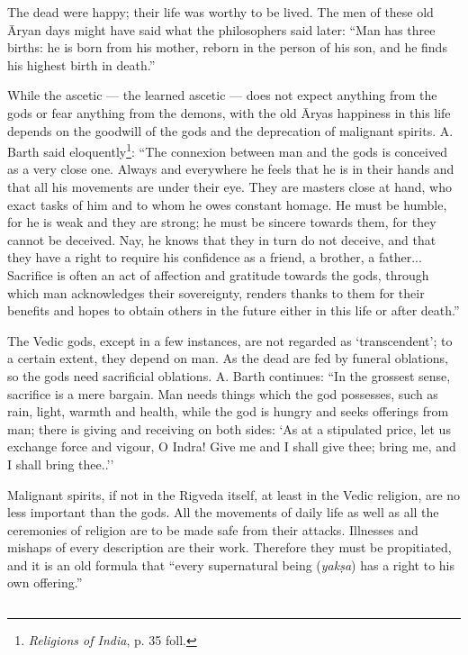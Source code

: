 \documentclass[a4paper, 11pt, oneside, english, landscape]{article}
\begin{document}
The dead were happy; their life was worthy to be lived. The men of these old Āryan days might have said what the philosophers said later: ``Man has three births: he is born from his mother, reborn in the person of his son, and he finds his highest birth in death.''

While the ascetic --- the learned ascetic --- does not expect anything from the gods or fear anything from the demons, with the old Āryas happiness in this life depends on the goodwill of the gods and the deprecation of malignant spirits. A. Barth said eloquently\footnote{\emph{Religions of India}, p. 35 foll.}: ``The connexion between man and the gods is conceived as a very close one. Always and everywhere he feels that he is in their hands and that all his movements are under their eye. They are masters close at hand, who exact tasks of him and to whom he owes constant homage. He must be humble, for he is weak and they are strong; he must be sincere towards them, for they cannot be deceived. Nay, he knows that they in turn do not deceive, and that they have a right to require his confidence as a friend, a brother, a father... Sacrifice is often an act of affection and gratitude towards the gods, through which man acknowledges their sovereignty, renders thanks to them for their benefits and hopes to obtain others in the future either in this life or after death.''

The Vedic gods, except in a few instances, are not regarded as `transcendent'; to a certain extent, they depend on man. As the dead are fed by funeral oblations, so the gods need sacrificial oblations. A. Barth continues: ``In the grossest sense, sacrifice is a mere bargain. Man needs things which the god possesses, such as rain, light, warmth and health, while the god is hungry and seeks offerings from man; there is giving and receiving on both sides: `As at a stipulated price, let us exchange force and vigour, O Indra! Give me and I shall give thee; bring me, and I shall bring thee..''

Malignant spirits, if not in the Rigveda itself, at least in the Vedic religion, are no less important than the gods. All the movements of daily life as well as all the ceremonies of religion are to be made safe from their attacks. Illnesses and mishaps of every description are their work. Therefore they must be propitiated, and it is an old formula that ``every supernatural being (\emph{yakṣa}) has a right to his own offering.''

\subsection{}
\end{document}
